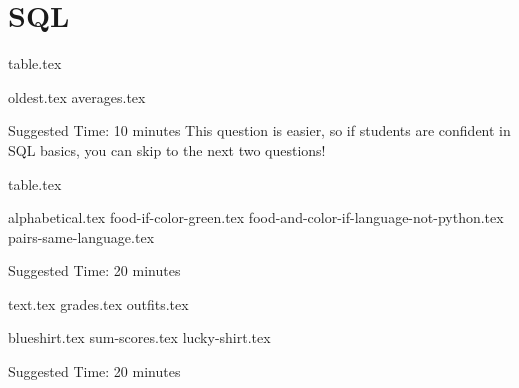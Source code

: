 \documentclass{exam}
\begin{document}
\section{SQL}
\begin{questions}
    {table.tex}
    \begin{parts}
        {oldest.tex}
        {averages.tex}
    \end{parts}
    \begin{questionmeta}
        Suggested Time: 10 minutes
        This question is easier, so if students are confident in SQL basics, you can skip to the next two questions!
    \end{questionmeta}

    \newpage

    {table.tex}
    \begin{parts}
        {alphabetical.tex}
        {food-if-color-green.tex}
        {food-and-color-if-language-not-python.tex}
        {pairs-same-language.tex}
    \end{parts}
    \begin{questionmeta}
        Suggested Time: 20 minutes
    \end{questionmeta}

    \newpage
  
    {text.tex}
    {grades.tex}
    {outfits.tex}
    \begin{parts}
        {blueshirt.tex}
        {sum-scores.tex}
        {lucky-shirt.tex}
    \end{parts}
    \begin{questionmeta}
        Suggested Time: 20 minutes
    \end{questionmeta}
\end{questions}
 
\end{document}

